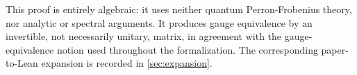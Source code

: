 This proof is entirely algebraic: it uses neither quantum Perron-Frobenius theory, nor analytic or spectral arguments. It produces gauge equivalence by an invertible, not necessarily unitary, matrix, in agreement with the gauge-equivalence notion used throughout the formalization. The corresponding paper-to-Lean expansion is recorded in \cref{sec:expansion}.
